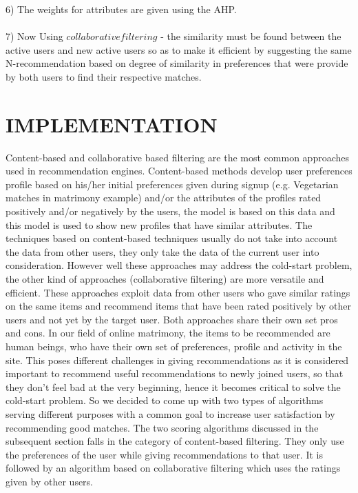 \documentclass[12pt,oneside]{book}
\begin{document}
6) The weights for attributes are given using the AHP.\\\\
7) Now Using $collaborative filtering$ - the similarity must be found between the active users and new active users so as to make it efficient by suggesting the same N-recommendation based on degree of similarity in preferences that were provide by both users to find their respective matches.
\section{IMPLEMENTATION}
Content-based and collaborative based filtering are the most common approaches used in recommendation engines. Content-based methods develop user preferences profile based on his/her initial preferences given during signup (e.g. Vegetarian matches in matrimony example) and/or the attributes of the profiles rated positively and/or negatively by the users, the model is based on this data and this model is used to show new profiles that have similar attributes. The techniques based on content-based techniques usually do not take into account the data from other users, they only take the data of the current user into consideration. However well these approaches may address the cold-start problem, the other kind of approaches (collaborative filtering) are more versatile and efficient. These approaches exploit data from other users who gave similar ratings on the same items and recommend items that have been rated positively by other users and not yet by the target user. Both approaches share their own set pros and cons. In our field of online matrimony, the items to be recommended are human beings, who have their own set of preferences, profile and activity in the site. This poses different challenges in giving recommendations as it is considered important to recommend useful recommendations to newly joined users, so that they don't feel bad at the very beginning, hence it becomes critical to solve the cold-start problem. So we decided to come up with two types of algorithms serving different purposes with a common goal to increase user satisfaction by recommending good matches.
The two scoring algorithms discussed in the subsequent section falls in the category of content-based filtering. They only use the preferences of the user while giving recommendations to that user. It is followed by an algorithm based on collaborative filtering which uses the ratings given by other users.
\end{document}
